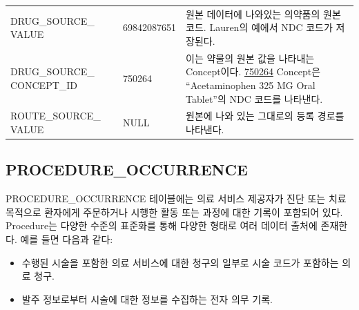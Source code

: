 \documentclass[11pt]{book}
\providecommand{\tightlist}{%
  \setlength{\itemsep}{0pt}\setlength{\parskip}{0pt}}
\theoremstyle{definition}
\theoremstyle{definition}
\theoremstyle{definition}
\theoremstyle{remark}
\begin{document}
\begin{longtable}[]{@{}lll@{}}
\begin{minipage}[t]{0.28\columnwidth}\raggedright\strut
DRUG\_SOURCE\_ VALUE\strut
\end{minipage} & \begin{minipage}[t]{0.16\columnwidth}\raggedright\strut
69842087651\strut
\end{minipage} & \begin{minipage}[t]{0.48\columnwidth}\raggedright\strut
원본 데이터에 나와있는 의약품의 원본 코드. Lauren의 예에서 NDC 코드가
저장된다.\strut
\end{minipage}\tabularnewline
\begin{minipage}[t]{0.28\columnwidth}\raggedright\strut
DRUG\_SOURCE\_ CONCEPT\_ID\strut
\end{minipage} & \begin{minipage}[t]{0.16\columnwidth}\raggedright\strut
750264\strut
\end{minipage} & \begin{minipage}[t]{0.48\columnwidth}\raggedright\strut
이는 약물의 원본 값을 나타내는 Concept이다.
\href{http://athena.ohdsi.org/search-terms/terms/750264}{750264}
Concept은 ``Acetaminophen 325 MG Oral Tablet''의 NDC 코드를
나타낸다.\strut
\end{minipage}\tabularnewline
\begin{minipage}[t]{0.28\columnwidth}\raggedright\strut
ROUTE\_SOURCE\_ VALUE\strut
\end{minipage} & \begin{minipage}[t]{0.16\columnwidth}\raggedright\strut
NULL\strut
\end{minipage} & \begin{minipage}[t]{0.48\columnwidth}\raggedright\strut
원본에 나와 있는 그대로의 등록 경로를 나타낸다.\strut
\end{minipage}\tabularnewline
\bottomrule
\end{longtable}

\subsection{PROCEDURE\_OCCURRENCE}\label{procedureOccurrence}

PROCEDURE\_OCCURRENCE 테이블에는 의료 서비스 제공자가 진단 또는 치료
목적으로 환자에게 주문하거나 시행한 활동 또는 과정에 대한 기록이
포함되어 있다. Procedure는 다양한 수준의 표준화를 통해 다양한 형태로
여러 데이터 출처에 존재한다. 예를 들면 다음과 같다:

\begin{itemize}
\tightlist
\item
  수행된 시술을 포함한 의료 서비스에 대한 청구의 일부로 시술 코드가
  포함하는 의료 청구.
\item
  발주 정보로부터 시술에 대한 정보를 수집하는 전자 의무 기록.
\end{itemize}
\end{document}
